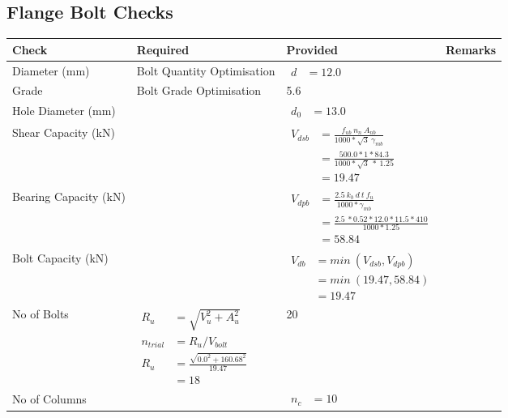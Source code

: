 \documentclass{article}%
\begin{document}
\subsection{Flange Bolt Checks}%
\label{subsec:FlangeBoltChecks}%
\renewcommand{\arraystretch}{1.2}%
\begin{longtable}{|p{4cm}|p{5cm}|p{5.5cm}|p{1.5cm}|}%
\hline%
\rowcolor{OsdagGreen}%
Check&Required&Provided&Remarks\\%
\hline%
\endhead%
\hline%
Diameter (mm)&Bolt Quantity Optimisation&$\begin{aligned} d &=12.0 \end{aligned}$&\\%
\hline%
Grade&Bolt Grade Optimisation&5.6&\\%
\hline%
Hole Diameter (mm)& &$\begin{aligned} d_0 &=13.0 \end{aligned}$&\\%
\hline%
Shear Capacity (kN)&&$\begin{aligned}V_{dsb} &= \frac{f_{ub} ~n_n~ A_{nb}}{1000*\sqrt{3} ~\gamma_{mb}}\\ &= \frac{500.0*1*84.3}{1000*\sqrt{3}~*~1.25}\\ &= 19.47\end{aligned}$&\\%
\hline%
Bearing Capacity (kN)&&$\begin{aligned}V_{dpb} &= \frac{2.5~ k_b~ d~ t~ f_u}{1000*\gamma_{mb}}\\ &= \frac{2.5~*0.52*12.0*11.5*410}{1000*1.25}\\ &=58.84\end{aligned}$&\\%
\hline%
Bolt Capacity (kN)&&$\begin{aligned}V_{db} &= min~ (V_{dsb}, V_{dpb})\\ &= min~ (19.47,58.84)\\ &=19.47\end{aligned}$&\\%
\hline%
No of Bolts&$\begin{aligned}R_{u} &= \sqrt{V_u^2+A_u^2}\\ n_{trial} &= R_u/ V_{bolt}\\ R_{u} &= \frac{\sqrt{0.0^2+160.68^2}}{19.47}\\ &=18\end{aligned}$&20&\\%
\hline%
No of Columns&&$\begin{aligned} n_c &=10 \end{aligned}$&\\%

\end{longtable}
\end{document}
